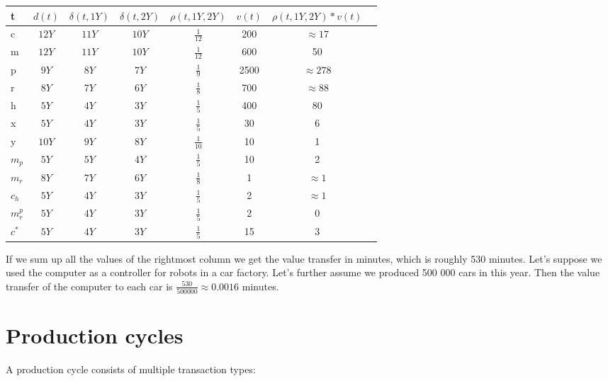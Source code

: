 \documentclass[11pt]{article}
\begin{document}
\begin{center}
  \begin{tabular}{ l | c | c | c | c | c | c | c}
    \hline
        t & $d(t)$ & $\delta(t, 1Y)$ & $\delta(t, 2Y)$ & $\rho(t, 1Y, 2Y)$ & $v(t)$ & $\rho(t, 1Y, 2Y) * v(t)$\\ \hline
    c & $12Y$ & $11Y$ & $10Y$ & $\frac{1}{12}$ & 200 & $\approx 17$ \\ \hline
    m & $12Y$ & $11Y$ & $10Y$ & $\frac{1}{12}$ & 600 & 50\\ \hline
    p & $9Y$ & $8Y$ & $7Y$ & $\frac{1}{9}$ & 2500 & $\approx 278$ \\ \hline
    r & $8Y$ & $7Y$ & $6Y$ & $\frac{1}{8}$ & 700 & $\approx 88$ \\ \hline
    h & $5Y$ & $4Y$ & $3Y$ & $\frac{1}{5}$ & 400 & 80\\ \hline
    x & $5Y$ & $4Y$ & $3Y$ & $\frac{1}{5}$ & 30 & 6\\ \hline
    y & $10Y$ & $9Y$ & $8Y$ & $\frac{1}{10}$ & 10 & 1 \\ \hline
    $m_{p}$ & $5Y$ & $5Y$ & $4Y$ & $\frac{1}{5}$ & 10 & 2\\ \hline
    $m_{r}$ & $8Y$ & $7Y$ & $6Y$ & $\frac{1}{8}$ & 1 & $\approx 1$ \\ \hline
    $c_{h}$ & $5Y$ & $4Y$ & $3Y$ & $\frac{1}{5}$ & 2 & $\approx 1$ \\ \hline
    $m^{p}_{r}$ & $5Y$ & $4Y$ & $3Y$ & $\frac{1}{5}$ & 2 & 0 \\ \hline
    $c^*$ & $5Y$ & $4Y$ & $3Y$ & $\frac{1}{5}$ & 15 & 3 \\ \hline
    \hline
  \end{tabular}
\end{center}

If we sum up all the values of the rightmost column we get the value transfer in minutes, which is roughly 530 minutes. Let's suppose we used the computer as a controller for robots in a car factory. Let's further assume we produced 500 000 cars in this year. Then the value transfer of the computer to each car is $\frac{530}{500 000} \approx 0.0016$ minutes.

\section{Production cycles}

A production cycle consists of multiple transaction types:
\end{document}

